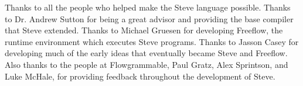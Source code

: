 
Thanks to all the people who helped make the Steve language possible.
Thanks to Dr. Andrew Sutton for being a great advisor and providing the base
compiler that Steve extended.
Thanks to Michael Gruesen for developing Freeflow, the runtime environment which executes
Steve programs.
Thanks to Jasson Casey for developing much of the early ideas that eventually became Steve and Freeflow.
Also thanks to the people at Flowgrammable, Paul Gratz, Alex Sprintson, and Luke McHale, for providing
feedback throughout the development of Steve.
